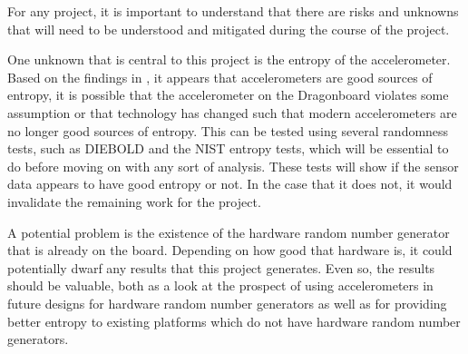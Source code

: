 

For any project, it is important to understand that there are risks and unknowns
that will need to be understood and mitigated during the course of the project.

One unknown that is central to this project is the entropy of the accelerometer.
Based on the findings in \cite{voris}, it appears that accelerometers are good
sources of entropy, it is possible that the accelerometer on the Dragonboard
violates some assumption or that technology has changed such that modern
accelerometers are no longer good sources of entropy. This can be tested using
several randomness tests, such as DIEBOLD and the NIST entropy tests, which will
be essential to do before moving on with any sort of analysis.  These tests will
show if the sensor data appears to have good entropy or not.  In the case that
it does not, it would invalidate the remaining work for the project. 


A potential problem is the existence of the hardware random number generator
that is already on the board. Depending on how good that hardware is, it could
potentially dwarf any results that this project generates. Even so, the results
should be valuable, both as a look at the prospect of using accelerometers in
future designs for hardware random number generators as well as for providing
better entropy to existing platforms which do not have hardware random number
generators. 
